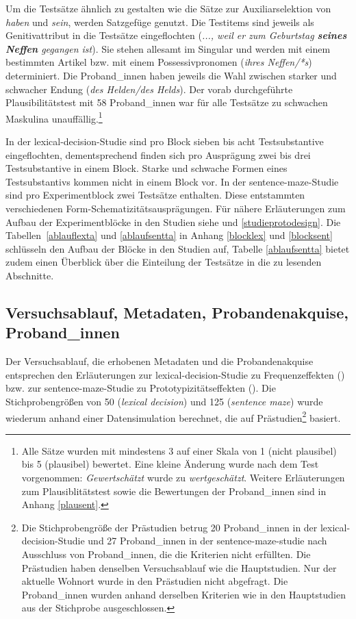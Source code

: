 Um die Testsätze ähnlich zu gestalten wie die Sätze zur Auxiliarselektion von \textit{haben} und \textit{sein}, werden Satzgefüge genutzt. Die Testitems sind jeweils als Genitivattribut in die Testsätze eingeflochten (\textit{..., weil er zum Geburtstag \textbf{seines Neffen} gegangen ist}). Sie stehen allesamt im Singular und werden mit einem bestimmten Artikel bzw. mit einem Possessivpronomen (\textit{ihres Neffen/*s}) determiniert. Die Proband\_innen haben jeweils die Wahl zwischen starker und schwacher Endung (\textit{des Helden/des Helds}).  Der vorab durchgeführte Plausibilitätstest mit 58 Proband\_innen war für alle Testsätze zu schwachen Maskulina unauffällig.\footnote{Alle Sätze wurden mit mindestens 3 auf einer Skala von 1 (nicht plausibel) bis 5 (plausibel) bewertet. Eine kleine Änderung wurde nach dem Test vorgenommen: \textit{Gewertschätzt} wurde zu \textit{wertgeschätzt}. Weitere Erläuterungen zum Plausiblitätstest sowie die Bewertungen der Proband\_innen sind in Anhang \ref{plausent}.} 

In der lexical-decision-Studie sind pro Block sieben bis acht Testsubstantive eingeflochten, dementsprechend finden sich pro Ausprägung zwei bis drei Testsubstantive in einem Block. Starke und schwache Formen eines Testsubstantivs kommen nicht in einem Block vor. In der sentence-maze-Studie sind pro Experimentblock zwei Testsätze enthalten. Diese entstammten verschiedenen Form-Schematizitätsausprägungen.  Für nähere Erläuterungen zum Aufbau der Experimentblöcke in den Studien siehe  und \ref{studieprotodesign}. Die Tabellen~\ref{ablauflexta} und \ref{ablaufsentta} in Anhang \ref{blocklex} und \ref{blocksent} schlüsseln den Aufbau der Blöcke in den Studien auf, Tabelle \ref{ablaufsentta} bietet zudem einen Überblick über die Einteilung der Testsätze in die zu lesenden Abschnitte.

\subsection{Versuchsablauf, Metadaten, Probandenakquise, Proband\_innen}
\label{probschema}
\begin{sloppypar}
Der Versuchsablauf, die erhobenen Metadaten und die Probandenakquise entsprechen den Erläuterungen zur lexical-decision-Studie zu Frequenzeffekten () bzw. zur sentence-maze-Studie zu Prototypizitätseffekten (). 
Die Stichprobengrößen von 50 (\textit{lexical decision}) und 125 (\textit{sentence maze}) wurde wiederum anhand einer Datensimulation berechnet, die auf Prästudien\footnote{Die Stichprobengröße der Prästudien betrug 20 Proband\_innen in der lexical-decision-Studie und 27 Proband\_innen in der sentence-maze-studie nach Ausschluss von Pro\-\mbox{band\_in}\-nen, die die Kriterien nicht erfüllten. Die Prästudien haben denselben Versuchsablauf wie die Hauptstudien. Nur der aktuelle Wohnort wurde in den Prästudien nicht abgefragt. Die Proband\_innen wurden anhand derselben Kriterien wie in den Hauptstudien aus der Stichprobe ausgeschlossen.} basiert.
\end{sloppypar}
 
